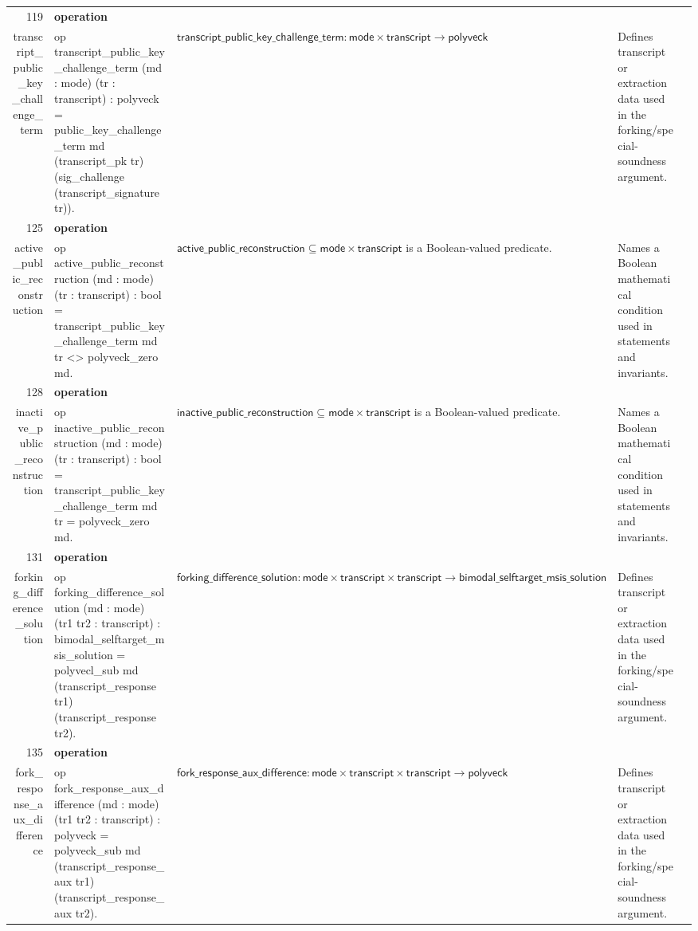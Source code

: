 \documentclass[10pt]{article}
\newcommand{\ec}[1]{\begingroup\ttfamily\scriptsize #1\endgroup}
\begin{document}
\begin{longtable}{r L{0.17\textwidth} L{0.26\textwidth} L{0.27\textwidth} L{0.20\textwidth}}
119 & \textbf{operation}\\\ec{transcript\_public\_key\_challenge\_term} & \ec{op transcript\_public\_key\_challenge\_term (md : mode) (tr : transcript) : polyveck = public\_key\_challenge\_term md (transcript\_pk tr) (sig\_challenge (transcript\_signature tr)).} & \(\mathsf{transcript\_public\_key\_challenge\_term} : \mathsf{mode} \times \mathsf{transcript} \to \mathsf{polyveck}\) & Defines transcript or extraction data used in the forking/special-soundness argument. \\
125 & \textbf{operation}\\\ec{active\_public\_reconstruction} & \ec{op active\_public\_reconstruction (md : mode) (tr : transcript) : bool = transcript\_public\_key\_challenge\_term md tr <> polyveck\_zero md.} & \(\mathsf{active\_public\_reconstruction} \subseteq \mathsf{mode} \times \mathsf{transcript}\) is a Boolean-valued predicate. & Names a Boolean mathematical condition used in statements and invariants. \\
128 & \textbf{operation}\\\ec{inactive\_public\_reconstruction} & \ec{op inactive\_public\_reconstruction (md : mode) (tr : transcript) : bool = transcript\_public\_key\_challenge\_term md tr = polyveck\_zero md.} & \(\mathsf{inactive\_public\_reconstruction} \subseteq \mathsf{mode} \times \mathsf{transcript}\) is a Boolean-valued predicate. & Names a Boolean mathematical condition used in statements and invariants. \\
131 & \textbf{operation}\\\ec{forking\_difference\_solution} & \ec{op forking\_difference\_solution (md : mode) (tr1 tr2 : transcript) : bimodal\_selftarget\_msis\_solution = polyvecl\_sub md (transcript\_response tr1) (transcript\_response tr2).} & \(\mathsf{forking\_difference\_solution} : \mathsf{mode} \times \mathsf{transcript} \times \mathsf{transcript} \to \mathsf{bimodal\_selftarget\_msis\_solution}\) & Defines transcript or extraction data used in the forking/special-soundness argument. \\
135 & \textbf{operation}\\\ec{fork\_response\_aux\_difference} & \ec{op fork\_response\_aux\_difference (md : mode) (tr1 tr2 : transcript) : polyveck = polyveck\_sub md (transcript\_response\_aux tr1) (transcript\_response\_aux tr2).} & \(\mathsf{fork\_response\_aux\_difference} : \mathsf{mode} \times \mathsf{transcript} \times \mathsf{transcript} \to \mathsf{polyveck}\) & Defines transcript or extraction data used in the forking/special-soundness argument. \\

\end{longtable}
\end{document}
